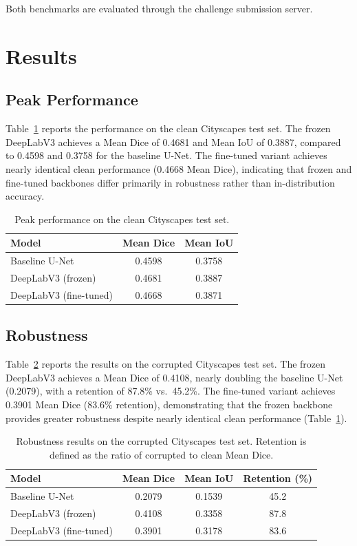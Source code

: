 \documentclass[conference]{IEEEtran}
\begin{document}
Both benchmarks are evaluated through the challenge submission server.

\section{Results}

\subsection{Peak Performance}

Table~\ref{tab:peak} reports the performance on the clean Cityscapes test set. The frozen DeepLabV3 achieves a Mean Dice of 0.4681 and Mean IoU of 0.3887, compared to 0.4598 and 0.3758 for the baseline U-Net. The fine-tuned variant achieves nearly identical clean performance (0.4668 Mean Dice), indicating that frozen and fine-tuned backbones differ primarily in robustness rather than in-distribution accuracy.

\begin{table}[h]
\centering
\caption{Peak performance on the clean Cityscapes test set.}
\label{tab:peak}
\begin{tabular}{lcc}
\toprule
Model & Mean Dice & Mean IoU \\
\midrule
Baseline U-Net          & 0.4598 & 0.3758 \\
DeepLabV3 (frozen)      & 0.4681 & 0.3887 \\
DeepLabV3 (fine-tuned)  & 0.4668 & 0.3871 \\
\bottomrule
\end{tabular}
\end{table}

\subsection{Robustness}

Table~\ref{tab:robustness} reports the results on the corrupted Cityscapes test set. The frozen DeepLabV3 achieves a Mean Dice of 0.4108, nearly doubling the baseline U-Net (0.2079), with a retention of 87.8\% vs.\ 45.2\%. The fine-tuned variant achieves 0.3901 Mean Dice (83.6\% retention), demonstrating that the frozen backbone provides greater robustness despite nearly identical clean performance (Table~\ref{tab:peak}).

\begin{table}[h]
\centering
\caption{Robustness results on the corrupted Cityscapes test set. Retention is defined as the ratio of corrupted to clean Mean Dice.}
\label{tab:robustness}
\begin{tabular}{lccc}
\toprule
Model & Mean Dice & Mean IoU & Retention (\%) \\
\midrule
Baseline U-Net         & 0.2079 & 0.1539 & 45.2 \\
DeepLabV3 (frozen)     & 0.4108 & 0.3358 & 87.8 \\
DeepLabV3 (fine-tuned) & 0.3901 & 0.3178 & 83.6 \\
\bottomrule
\end{tabular}
\end{table}
\end{document}
